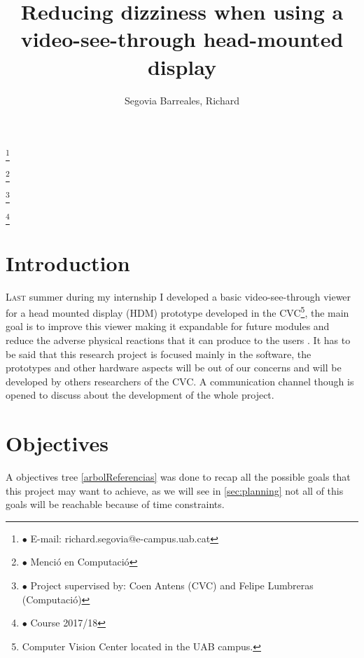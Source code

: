 \documentclass[10pt,a4paper,twocolumn,twoside]{article}
\author{\LARGE\sffamily Segovia Barreales, Richard}
\title{\Huge{\sffamily Reducing dizziness when using a video-see-through head-mounted display}}
\date{}
\newcommand\blfootnote[1]{%
  \begingroup
  \renewcommand\thefootnote{}\footnote{#1}%
  \addtocounter{footnote}{-1}%
  \endgroup
}
\begin{document}
\fancyhead[RO]{\thepage}
\fancyhead[LE]{\thepage}

\fancyfoot[CO,CE]{}

{
   \fancyhf{}
}

\renewcommand{\headrulewidth}{0pt}
\renewcommand{\footrulewidth}{0pt}
\pagestyle{fancy}

\maketitle

\thispagestyle{primerapagina}


\blfootnote{$\bullet$ E-mail: richard.segovia@e-campus.uab.cat}
\blfootnote{$\bullet$ Menció en Computació}
\blfootnote{$\bullet$ Project supervised by: Coen Antens (CVC) and Felipe Lumbreras (Computació)}
\blfootnote{$\bullet$ Course 2017/18}


\section{Introduction}

\lettrine[lines=3]{L}{ast} summer during my internship I developed a basic video-see-through viewer for a head mounted display (HDM) prototype developed in the CVC\footnote{Computer Vision Center located in the UAB campus.}, the main goal is to improve this viewer making it expandable for future modules and reduce the adverse physical reactions that it can produce to the users \cite{disconfortReview}. It has to be said that this research project is focused mainly in the software, the prototypes and other hardware aspects will be out of our concerns and will be developed by others researchers of the CVC. A communication channel though is opened to discuss about the development of the whole project.

\section{Objectives}

A objectives tree \ref{arbolReferencias} was done to recap all the possible goals that this project may want to achieve, as we will see in \ref{sec:planning} not all of this goals will be reachable because of time constraints.
\end{document}
